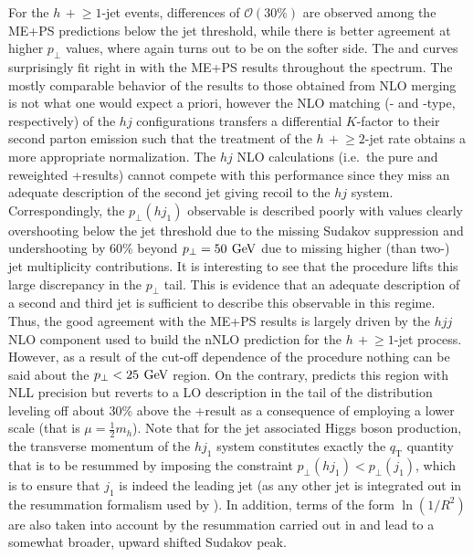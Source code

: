 For the $h\,+\!\ge\!1$-jet events, differences of $\mathcal{O}(30\%)$ are
observed among the ME+PS predictions below the jet threshold, while
there is better agreement at higher $p_\perp$ values, where again
\hjetscompHerwig turns out to be on the softer side. The \hjetscompPowheg and \hjetscompSherpa \hjetscompNNLOPS 
curves surprisingly fit right in with the ME+PS results throughout 
the spectrum. The mostly comparable
behavior of the \hjetscompNNLOPS results to those obtained from NLO merging is
not what one would expect a priori, however the NLO matching (\hjetscompPowheg- 
and \hjetscompSMCatNLO-type, respectively) of the $hj$ configurations transfers 
a differential $K$-factor to their second parton emission such that 
the \hjetscompLOPS treatment of the $h\,+\!\ge\!2$-jet rate
obtains a more appropriate normalization. The $hj$ NLO calculations
(i.e.~the pure and \hjetscompMinlo reweighted \hjetscompGoSam{}+\hjetscompSherpa results) cannot
compete with this performance since they miss an adequate description 
of the second jet giving recoil to the $hj$ system.
Correspondingly, the $p_\perp(hj_1)$ observable is described poorly
with values clearly overshooting below the jet threshold due to the
missing Sudakov suppression and undershooting by 60\% beyond
$p_\perp=50\,\text{\:GeV}$ due to missing higher (than two-) jet multiplicity
contributions. It is interesting to see that the \hjetscompLoopsim procedure
lifts this large discrepancy in the $p_\perp$ tail. This is evidence
that an adequate description of a second and third jet is sufficient
to describe this observable in this regime. Thus, the good agreement
with the ME+PS results is largely driven by the $hjj$ NLO component
used to build the nNLO prediction for the $h\,+\!\ge\!1$-jet
process. However, as a result of the cut-off dependence of the
procedure nothing can be said about the $p_\perp<25\,\text{\:GeV}$ region.
On the contrary, \hjetscompResbos predicts this region with NLL precision but
reverts to a LO description in the tail of the distribution leveling
off about 30\% above the \hjetscompGoSam{}+\hjetscompSherpa result as a consequence of
employing a lower scale (that is $\mu=\tfrac{1}{2}m_h$). Note that for
the jet associated Higgs boson production, the transverse momentum of
the $hj_1$ system constitutes exactly the $q_\text{T}$ quantity that is to be
resummed by \hjetscompResbos imposing the constraint $p_\perp(hj_1)<p_\perp(j_1)$,
which is to ensure that $j_1$ is indeed the leading jet (as any other
jet is integrated out in the resummation formalism used by \hjetscompResbos).
In addition, terms of the form $\ln(1/R^2)$ are also taken into
account by the resummation carried out in \hjetscompResbos and lead to a
somewhat broader, upward shifted Sudakov peak.

